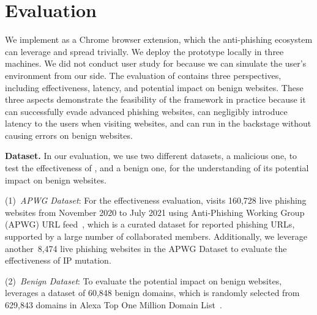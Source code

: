 \newcommand{\proxytotalphishing}{8,474\xspace}
\newcommand{\proxyevadephishing}{7,540\xspace}
\newcommand{\proxyphishingperc}{88.98\%\xspace}


\section{Evaluation}
\label{s:eval}

We implement \spartacus as a Chrome browser extension, which the anti-phishing ecosystem can leverage and spread trivially.
We deploy the prototype locally in three machines.
We did not conduct user study for \spartacus because we can simulate the user's environment from our side.
The evaluation of \spartacus contains three perspectives, including effectiveness, latency, and potential impact on benign websites.
These three aspects demonstrate the feasibility of the \spartacus framework in practice because it can successfully evade advanced phishing websites, can negligibly introduce latency to the users when visiting websites, and can run in the backstage without causing errors on benign websites.

\noindent
\textbf{Dataset.}
In our evaluation, we use two different datasets, a malicious one, to test the effectiveness of \spartacus, and a benign one, for the understanding of its potential impact on benign websites.

\noindent
(1)~\emph{APWG Dataset}:
For the effectiveness evaluation, \spartacus visits 160,728 live phishing websites from November 2020 to July 2021 using Anti-Phishing Working Group (APWG) URL feed~\cite{ecrimeexchange},
which is a curated dataset for reported phishing URLs, supported by a large number of collaborated members.
Additionally, we leverage another~\proxytotalphishing live phishing websites in the APWG Dataset to evaluate the effectiveness of IP mutation.

\noindent
(2)~\emph{Benign Dataset}:
To evaluate the potential impact on benign websites, \spartacus leverages a dataset of 60,848 benign domains, which is randomly selected from 629,843 domains in Alexa Top One Million Domain List~\cite{AlexaTop1M}.




